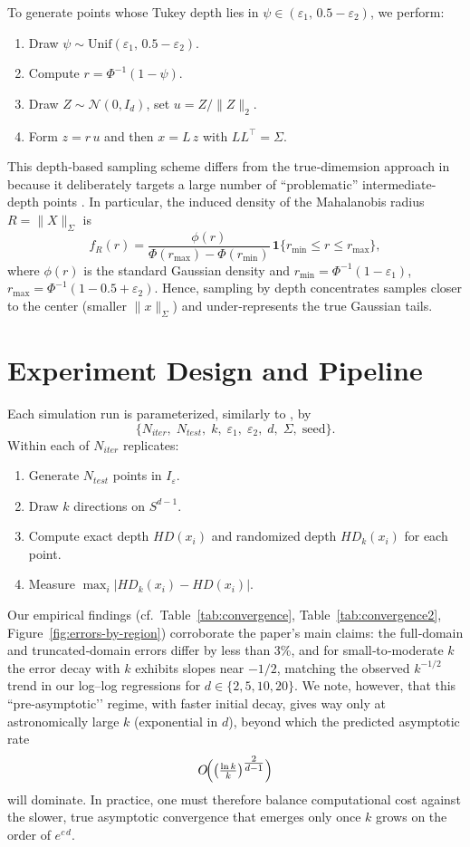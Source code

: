 \documentclass[12pt]{report}
\begin{document}
To generate points whose Tukey depth lies in
\(\psi\in(\varepsilon_1,\,0.5-\varepsilon_2)\), we perform:
\begin{enumerate}
  \item Draw \(\psi \sim \mathrm{Unif}(\varepsilon_1,\,0.5-\varepsilon_2)\).
  \item Compute \(r = \Phi^{-1}(1 - \psi)\).
  \item Draw \(Z\sim\mathcal N(0,I_d)\), set \(u = Z / \|Z\|_2\).
  \item Form \(z = r\,u\) and then \(x = L\,z\) with \(LL^\top = \Sigma\).
\end{enumerate}

This depth‐based sampling scheme differs from the true‐dimemsion approach in \cite{UniformConvergence} because it deliberately targets a large number of “problematic” intermediate‐depth points \cite{QualityRandomizedDepth}.  In particular, the induced density of the Mahalanobis radius \(R = \|X\|_{\Sigma}\) is
\[
  f_R(r)
  = \frac{\phi(r)}{\Phi(r_{\max}) - \Phi(r_{\min})}
    \,\mathbf{1}\{r_{\min}\le r\le r_{\max}\},
\]
where $\phi(r)$ is the standard Gaussian density and \(r_{\min}=\Phi^{-1}(1-\varepsilon_1)\), \(r_{\max}=\Phi^{-1}(1-0.5+\varepsilon_2)\).
Hence, sampling by depth concentrates samples closer to the center (smaller \(\|x\|_{\Sigma}\)) and under‐represents the true Gaussian tails.


\section{Experiment Design and Pipeline}

Each simulation run is parameterized, similarly to \cite{UniformConvergence}, by
\[
  \{N_{iter},\;N_{test},\;k,\;\varepsilon_1,\;\varepsilon_2,\;d,\;\Sigma,\;\text{seed}\}.
\]
Within each of $N_{iter}$ replicates:
\begin{enumerate}
  \item Generate $N_{test}$ points in $I_{\varepsilon}$.  
  \item Draw $k$ directions on $S^{d-1}$.  
  \item Compute exact depth $HD(x_i)$ and randomized depth $HD_k(x_i)$ for each point.  
  \item Measure $\max_i|HD_k(x_i) - HD(x_i)|$.
\end{enumerate}

Our empirical findings (cf.\ Table~\ref{tab:convergence}, Table~\ref{tab:convergence2}, Figure~\ref{fig:errors-by-region}) corroborate the paper’s main claims: the full‐domain and truncated‐domain errors differ by less than 3\%, and for small‐to‐moderate $k$ the error decay with $k$ exhibits slopes near $-1/2$, matching the observed $k^{-1/2}$ trend in our log–log regressions for $d\in\{2,5,10,20\}$.  We note, however, that this ``pre‐asymptotic’’ regime, with faster initial decay, gives way only at astronomically large $k$ (exponential in $d$), beyond which the predicted asymptotic rate 
\[
O\!\Bigl(\bigl(\tfrac{\ln k}{k}\bigr)^{\tfrac{2}{d-1}}\Bigr)
\]
will dominate.  In practice, one must therefore balance computational cost against the slower, true asymptotic convergence that emerges only once $k$ grows on the order of $e^{c\,d}$.
\end{document}
